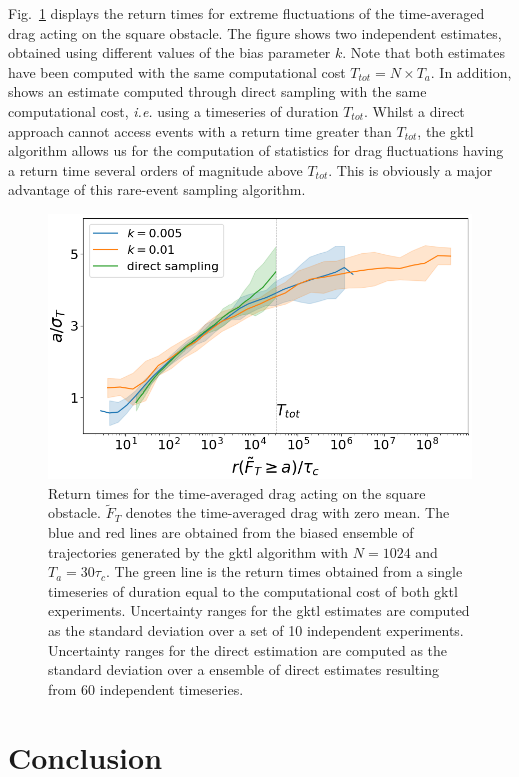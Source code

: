 \documentclass{jfm}
\newcommand{\EL}[1]{{\color{myred}{#1}}}
\begin{document}
Fig.~\ref{fig:return_times_gktl} displays the return times for extreme fluctuations of the time-averaged drag acting on the square obstacle.
The figure shows two independent estimates, obtained using different values of the bias parameter $k$.
Note that both estimates have been computed with the same computational cost $T_{tot}=N\times T_a$.
In addition, \EL{Fig.~\ref{fig:return_times_gktl}} shows an estimate computed through direct sampling with the same computational cost, \textit{i.e.} using a timeseries of duration $T_{tot}$.
Whilst a direct approach cannot access events with a return time greater than $T_{tot}$, the \ac{gktl} algorithm allows us for the computation of statistics for drag fluctuations having a return time several orders of magnitude above $T_{tot}$. This is  obviously a major advantage of this rare-event sampling algorithm. 

\begin{figure}
	\centering
	\includegraphics[width=.7\linewidth]{return_times_GKTL/return_times_GKTL}
	\caption{\label{fig:return_times_gktl} Return times for the time-averaged drag acting on the square obstacle. $\tilde{F}_T$ denotes the time-averaged drag with zero mean. The blue and red lines are obtained from the biased ensemble of trajectories generated by the \ac{gktl} algorithm with $N=1024$ and $T_a=30\tau_c$. The green line is the return times obtained from a single timeseries of duration equal to the computational cost of both \ac{gktl} experiments. Uncertainty ranges for the \ac{gktl} estimates are computed as the standard deviation over a set of 10 independent experiments. Uncertainty ranges for the direct estimation are computed as the standard deviation over a ensemble of direct estimates resulting from 60 independent timeseries.}
\end{figure}

\section{Conclusion}
\label{conlusion}
\end{document}
